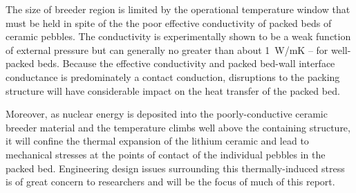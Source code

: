 The size of breeder region is limited by the operational temperature window that must be held in spite of the the poor effective conductivity of packed beds of ceramic pebbles. The conductivity is experimentally shown to be a weak function of external pressure but can generally no greater than about \si{1 W/{mK}} -- for well-packed beds. Because the effective conductivity and packed bed-wall interface conductance is predominately a contact conduction, disruptions to the packing structure will have considerable impact on the heat transfer of the packed bed.

Moreover, as nuclear energy is deposited into the poorly-conductive ceramic breeder material and the temperature climbs well above the containing structure, it will confine the thermal expansion of the lithium ceramic and lead to mechanical stresses at the points of contact of the individual pebbles in the packed bed. Engineering design issues surrounding this thermally-induced stress is of great concern to researchers and will be the focus of much of this report.





